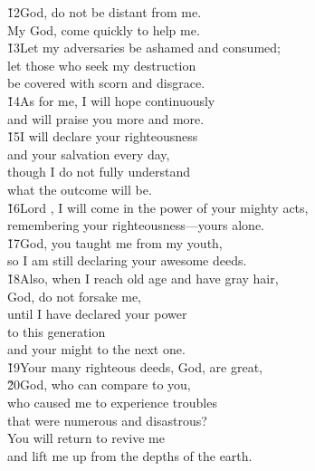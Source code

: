 \begin{poetry}
\poeml \v{12}God, do not be distant from me. \\
\poemll    My God, come quickly to help me. \\
\poeml \v{13}Let my adversaries be ashamed and consumed; \\
\poemll    let those who seek my destruction \\
\poemlll       be covered with scorn and disgrace. \\
\poeml \v{14}As for me, I will hope continuously \\
\poemll    and will praise you more and more. \\
\poeml \v{15}I will declare your righteousness \\
\poemll    and your salvation every day, \\
\poeml though I do not fully understand \\
\poemll    what the outcome will be. \\
\poeml \v{16}Lord , I will come in the power of your mighty acts, \\
\poemll    remembering your righteousness---yours alone. \\
\poeml \v{17}God, you taught me from my youth, \\
\poemll    so I am still declaring your awesome deeds. \\
\poeml \v{18}Also, when I reach old age and have gray hair, \\
\poemll    God, do not forsake me, \\
\poeml until I have declared your power \\
\poemll    to this generation \\
\poemlll       and your might to the next one. \\
\poeml \v{19}Your many righteous deeds, God, are great, \\
\poeml \v{20}God, who can compare to you, \\
\poeml who caused me to experience troubles \\
\poeml that were numerous and disastrous? \\
\poeml You will return to revive me \\
\poemll    and lift me up from the depths of the earth. \\

\end{poetry}
